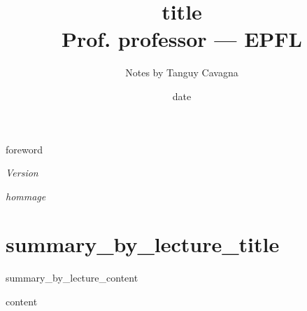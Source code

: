 \documentclass[a4paper]{book}
\title{{title}\\ Prof. {professor} --- EPFL}
\author{Notes {by} Tanguy Cavagna}
\date{{date}}
\begin{document}
\maketitle

\clearemptydoublepage
\thispagestyle{empty}



\vspace*{\fill}
{foreword}
\vspace*{\fill}
\vspace*{\fill}
\begin{center}
\initcurrdate
\def\setdateformat{Y--m--d}
\textit{Version }
\end{center}
\vspace*{\fill}

\clearemptydoublepage


\thispagestyle{empty}
\vspace*{\fill}
\begin{flushright}
\begin{minipage}{7cm}
{\itshape 
{hommage}
}
\end{minipage}
\end{flushright}
\vspace*{\fill}
\vspace*{\fill}

\clearemptydoublepage


\tableofcontents

\cleardoublepage


\renewcommand{\cftchapleader}{\cftdotfill{\cftdotsep}}
\renewcommand*{\cftchapfont}{}

\listoflectures


\chapter{{summary_by_lecture_title}}

{summary_by_lecture_content}


\cleardoublepage

{content}


\clearemptydoublepage
\end{document}
